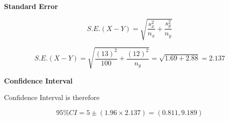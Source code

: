 \documentclass[a4paper,12pt]{article}
\begin{document}
\noindent \textbf{Standard Error}



\[S.E.(X-Y) = \sqrt{\frac{s^2_x}{n_x} + \frac{s^2_y}{n_y}} \]


\[S.E.(X-Y) = \sqrt{\frac{(13)^2}{100} + \frac{(12)^2}{n_y}}  = \sqrt{1.69 + 2.88} = 2.137 \]


\noindent \textbf{Confidence Interval}


\noindent Confidence Interval is therefore

\[95\% CI = 5 \pm (1.96 \times 2.137) =(0.811,9.189)\]
\end{document}
